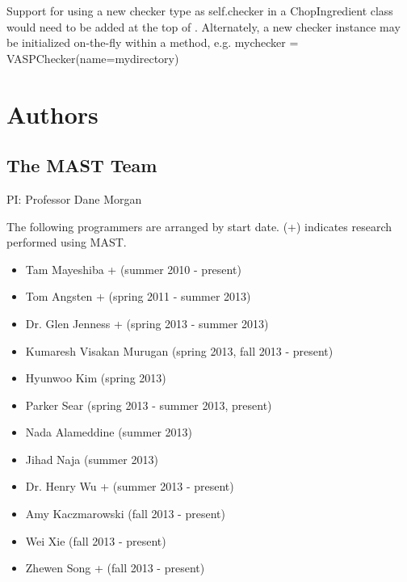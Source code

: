 \documentclass[letterpaper,10pt,english]{sphinxmanual}
\begin{document}
Support for using a new checker type as self.checker in a ChopIngredient class would need to be added at the top of .
Alternately, a new checker instance may be initialized on-the-fly within a method, e.g. mychecker = VASPChecker(name=mydirectory)


\chapter{Authors}
\label{8_0_personnel::doc}\label{8_0_personnel:authors}

\section{The MAST Team}
\label{8_0_personnel:the-mast-team}
PI: Professor Dane Morgan

The following programmers are arranged by start date. (+) indicates research performed using MAST.
\begin{itemize}
\item {} 
Tam Mayeshiba + (summer 2010 - present)

\item {} 
Tom Angsten + (spring 2011 - summer 2013)

\item {} 
Dr. Glen Jenness + (spring 2013 - summer 2013)

\item {} 
Kumaresh Visakan Murugan (spring 2013, fall 2013 - present)

\item {} 
Hyunwoo Kim (spring 2013)

\item {} 
Parker Sear (spring 2013 - summer 2013, present)

\item {} 
Nada Alameddine (summer 2013)

\item {} 
Jihad Naja (summer 2013)

\item {} 
Dr. Henry Wu + (summer 2013 - present)

\item {} 
Amy Kaczmarowski (fall 2013 - present)

\item {} 
Wei Xie (fall 2013 - present)

\item {} 
Zhewen Song + (fall 2013 - present)

\end{itemize}
\end{document}
